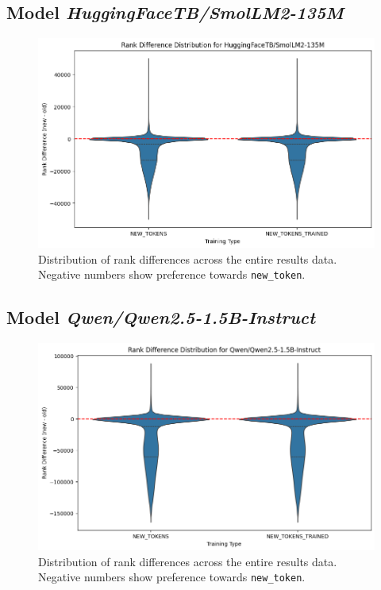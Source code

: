 \subsection*{Model \textit{HuggingFaceTB/SmolLM2-135M}}
\begin{figure}[H]
    \centering
    \includegraphics[width=1\textwidth]{Figures//Appendix/violin_smol135M.png}
    \caption{Distribution of rank differences across the entire results data. Negative numbers show preference towards \texttt{new\_token}.}
    \label{fig:violin_rank_dist:smol135M}
\end{figure}


\subsection*{Model \textit{Qwen/Qwen2.5-1.5B-Instruct}}
\begin{figure}[H]
    \centering
    \includegraphics[width=1\textwidth]{Figures//Appendix/violin_qwen.png}
    \caption{Distribution of rank differences across the entire results data. Negative numbers show preference towards \texttt{new\_token}.}
    \label{fig:violin_rank_dist:qwen1.5B}
\end{figure}


